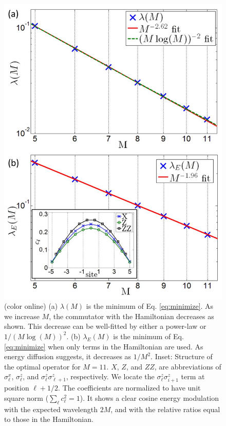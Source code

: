 \documentclass[twocolumn,superscriptaddress, prl,showpacs]{revtex4-1}
\begin{document}
\begin{figure}
\includegraphics[width=0.95\linewidth]{fig_hamiltonian.pdf}
\centering
\caption{(color online) (a) $\lambda(M)$ is the minimum of Eq. \eqref{eq:minimize}.  As we increase $M$, the commutator with the Hamiltonian decreases as shown.
This decrease can be well-fitted by either a power-law or $1/(M\log(M))^2$.
(b) $\lambda_E(M)$ is the minimum of Eq. \eqref{eq:minimize} when only terms in the Hamiltonian are used.  As energy diffusion suggests, it decreases as $1/M^2$. Inset: Structure of the optimal operator for $M = 11$. $X$, $Z$, and $ZZ$, are
abbreviations of $\sigma^x_\ell$, $\sigma^z_\ell$, and $\sigma^z_\ell \sigma^z_{\ell+1}$, respectively.
We locate the $\sigma^z_\ell \sigma^z_{i+1}$ term at position $\ell+1/2$.  The coefficients are normalized to have unit square norm ($\sum_\ell c_\ell^2 = 1$).
It shows a clear cosine energy modulation with the expected wavelength $2M$, and with the relative ratios equal to those in the Hamiltonian.}
\label{fig:hamiltonian}
\end{figure}
\end{document}
